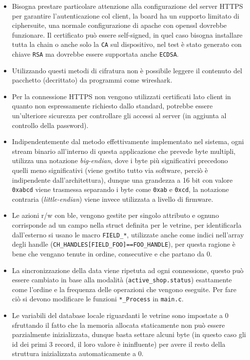 \begin{itemize}
  \item Bisogna prestare particolare attenzione alla configurazione del server HTTPS per garantire l'autenticazione col client, la board ha un supporto limitato di ciphersuite, una normale configurazione di apache con openssl dovrebbe funzionare. Il certificato pu\`o essere self-signed, in quel caso bisogna installare tutta la chain o anche solo la \texttt{CA} sul dispositivo, nel test \`e stato generato con chiave \texttt{RSA} ma dovrebbe essere supportata anche \texttt{ECDSA}.
  \item Utilizzando questi metodi di cifratura non \`e possibile leggere il contenuto del pacchetto (decrittato) da programmi come wireshark.
  \item Per la connessione HTTPS non vengono utilizzati certificati lato client in quanto non espressamente richiesto dallo standard, potrebbe essere un'ulteriore sicurezza per controllare gli accessi al server (in aggiunta al controllo della password).
  \item Indipendentemente dal metodo effettivamente implementato nel sistema, ogni stream binario all'interno di questa applicazione che prevede byte multipli, utilizza una notazione \textit{big-endian}, dove i byte pi\`u significativi precedono quelli meno significativi (viene gestito tutto via software, perci\`o \`e indipendente dall'architettura), dunque una grandezza a 16 bit con valore \texttt{0xabcd} viene trasmessa separando i byte come \texttt{0xab} e \texttt{0xcd}, la notazione contraria (\textit{little-endian}) viene invece utilizzata a livello di firmware.
  \item Le azioni r/w con ble, vengono gestite per singolo attributo e ognuno corrisponde ad un campo nella struct definita per le vetrine, per identificarla dall'esterno si usano le macro \texttt{FIELD\_*}, utilizzate anche come indici nell'array degli handle (\texttt{CH\_HANDLES[FIELD\_FOO]==FOO\_HANDLE}), per questa ragione \`e bene che vengano tenute in ordine, consecutive e che partano da 0.
  \item La sincronizzazione della data viene ripetuta ad ogni connessione, questo pu\`o essere cambiato in base alla modalit\`a (\texttt{active\_shop.status}) esattamente come l'ordine e la frequenza delle operazioni che vengono eseguite. Per fare ci\`o si devono modificare le funzioni \texttt{*\_Process} in \texttt{main.c}.
  \item Le variabili del database locale riguardanti le vetrine sono impostate a 0 sfruttando il fatto che la memoria allocata staticamente non pu\`o essere parzialmente inizializzata, dunque basta settare alcuni byte (in questo caso gli id dei primi 3 record, il loro valore \`e ininfluente) per avere il resto della struttura inizializzata automaticamente a 0.

\end{itemize}

